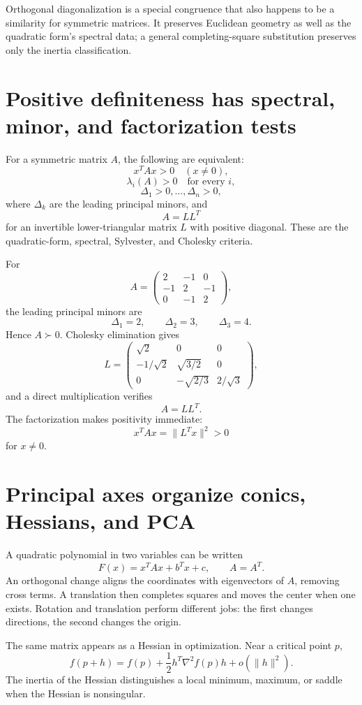 Orthogonal diagonalization is a special congruence that also happens to be a similarity for symmetric matrices.  It preserves Euclidean geometry as well as the quadratic form's spectral data; a general completing-square substitution preserves only the inertia classification.

\section{Positive definiteness has spectral, minor, and factorization tests}

For a symmetric matrix \(A\), the following are equivalent:
\[
  x^TAx>0\quad(x\ne0),
\]
\[
  \lambda_i(A)>0\quad\text{for every }i,
\]
\[
  \Delta_1>0,\ldots,\Delta_n>0,
\]
where \(\Delta_k\) are the leading principal minors, and
\[
  A=LL^T
\]
for an invertible lower-triangular matrix \(L\) with positive diagonal.  These are the quadratic-form, spectral, Sylvester, and Cholesky criteria.

For
\[
  A=
  \begin{pmatrix}
    2&-1&0\\
    -1&2&-1\\
    0&-1&2
  \end{pmatrix},
\]
the leading principal minors are
\[
  \Delta_1=2,
  \qquad
  \Delta_2=3,
  \qquad
  \Delta_3=4.
\]
Hence \(A\succ0\).  Cholesky elimination gives
\[
  L=
  \begin{pmatrix}
    \sqrt2&0&0\\
    -1/\sqrt2&\sqrt{3/2}&0\\
    0&-\sqrt{2/3}&2/\sqrt3
  \end{pmatrix},
\]
and a direct multiplication verifies
\[
  A=LL^T.
\]
The factorization makes positivity immediate:
\[
  x^TAx=\|L^Tx\|^2>0
\]
for \(x\ne0\).

\section{Principal axes organize conics, Hessians, and PCA}

A quadratic polynomial in two variables can be written
\[
  F(x)=x^TAx+b^Tx+c,
  \qquad A=A^T.
\]
An orthogonal change aligns the coordinates with eigenvectors of \(A\), removing cross terms.  A translation then completes squares and moves the center when one exists.  Rotation and translation perform different jobs: the first changes directions, the second changes the origin.

The same matrix appears as a Hessian in optimization.  Near a critical point \(p\),
\[
  f(p+h)
  =f(p)+\frac12h^T\nabla^2f(p)h+o(\|h\|^2).
\]
The inertia of the Hessian distinguishes a local minimum, maximum, or saddle when the Hessian is nonsingular.

